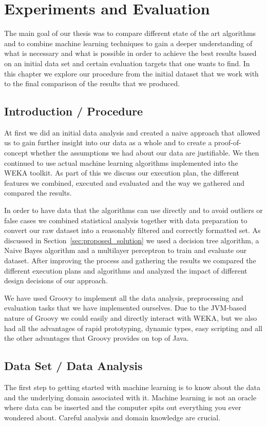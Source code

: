 \newpage
\chapter{Experiments and Evaluation}
\label{cha:experiments}

The main goal of our thesis was to compare different state of the art algorithms and to combine machine learning techniques to gain a deeper understanding of what is necessary and what is possible in order to achieve the best results based on an initial data set and certain evaluation targets that one wants to find. In this chapter we explore our procedure from the initial dataset that we work with to the final comparison of the results that we produced.

\section{Introduction / Procedure}

At first we did an initial data analysis and created a naive approach that allowed us to gain further insight into our data as a whole and to create a proof-of-concept whether the assumptions we had about our data are justifiable. 
We then continued to use actual machine learning algorithms implemented into the WEKA toolkit. As part of this we discuss our execution plan, the different features we combined, executed and evaluated and the way we gathered and compared the results.

In order to have data that the algorithms can use directly and to avoid outliers or false cases we combined statistical analysis together with data preparation to convert our raw dataset into a reasonably filtered and correctly formatted set. As discussed in Section~\ref{sec:proposed_solution} we used a decision tree algorithm, a Naive Bayes algorithm and a multilayer perceptron to train and evaluate our dataset. After improving the process and gathering the results we compared the different execution plans and algorithms and analyzed the impact of different design decisions of our approach.

We have used Groovy to implement all the data analysis, preprocessing and evaluation tasks that we have implemented ourselves. Due to the JVM-based nature of Groovy we could easily and directly interact with WEKA, but we also had all the advantages of rapid prototyping, dynamic types, easy scripting and all the other advantages that Groovy provides on top of Java. 

\section{Data Set / Data Analysis}
\label{sec:data_set}
The first step to getting started with machine learning is to know about the data and the underlying domain associated with it. Machine learning is not an oracle where data can be inserted and the computer spits out everything you ever wondered about. Careful analysis and domain knowledge are crucial. 


